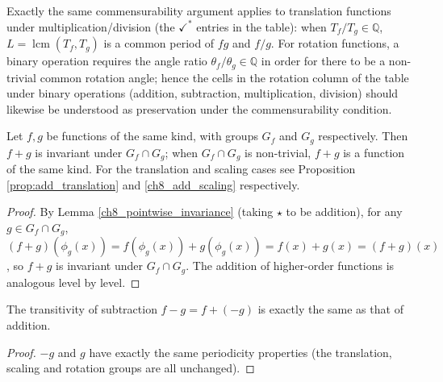 \begin{remark}\label{ch8_pointwise_commensurable}
Exactly the same commensurability argument applies to translation functions under multiplication/division (the $\checkmark^*$ entries in the table): when $T_f/T_g\in\mathbb{Q}$, $L=\operatorname{lcm}(T_f,T_g)$ is a common period of $fg$ and $f/g$. For rotation functions, a binary operation requires the angle ratio $\theta_f/\theta_g\in\mathbb{Q}$ in order for there to be a non-trivial common rotation angle; hence the cells in the rotation column of the table under binary operations (addition, subtraction, multiplication, division) should likewise be understood as preservation under the commensurability condition.
\end{remark}

\begin{proposition}\label{prop:add_all}
Let $f, g$ be functions of the same kind, with groups $G_f$ and $G_g$ respectively. Then $f+g$ is invariant under $G_f \cap G_g$; when $G_f\cap G_g$ is non-trivial, $f+g$ is a function of the same kind. For the translation and scaling cases see Proposition \ref{prop:add_translation} and \ref{ch8_add_scaling} respectively.
\end{proposition}

\begin{proof}
By Lemma \ref{ch8_pointwise_invariance} (taking $\star$ to be addition), for any $g \in G_f \cap G_g$, $(f+g)(\phi_g(x)) = f(\phi_g(x)) + g(\phi_g(x)) = f(x) + g(x) = (f+g)(x)$, so $f+g$ is invariant under $G_f\cap G_g$. The addition of higher-order functions is analogous level by level.
\end{proof}

\begin{proposition}\label{prop:subtraction_all}
The transitivity of subtraction $f - g = f + (-g)$ is exactly the same as that of addition.
\end{proposition}

\begin{proof}
$-g$ and $g$ have exactly the same periodicity properties (the translation, scaling and rotation groups are all unchanged).
\end{proof}

